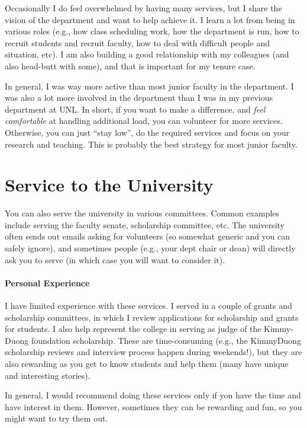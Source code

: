 \documentclass[oneside,11pt,dvipsnames]{book}
\begin{document}
Occasionally I do feel overwhelmed by having many services, but I share the vision of the department and want to help achieve it.
I learn a lot from being in various roles (e.g., how class scheduling work, how the department is run, how to recruit students and recruit faculty, how to deal with difficult people and situation, etc).
I am also building a good relationship with my colleagues (and also head-butt with some), and that is important for my tenure case. 

In general, I was way more active than most junior faculty in the department.  I was also a lot more involved in the department than I was in my previous department at UNL.
In short, if you want to make a difference, and \emph{feel comfortable} at handling additional load, you can volunteer for more services. Otherwise, you can just ``stay low'',
do the required services and focus on your research and teaching. This is probably the best strategy for most junior faculty. 

\section{Service to the University}
You can also serve the university in various committees.
Common examples include serving the faculty senate, scholarship committee, etc. The university often sends out emails asking for volunteers (so somewhat generic and you can safely ignore), and sometimes people (e.g., your dept chair or dean) will directly ask you to serve (in which case you will want to consider it).

\paragraph{Personal Experience} I have limited experience with these services. I served in a couple of grants and scholarship committees, in which I review applications for scholarship and grants for students. I also help represent the college in serving as judge of the Kimmy-Duong foundation scholarship. These are time-consuming (e.g., the KimmyDuong scholarship reviews and interview process happen during weekends!), but they are also rewarding as you get to know students and help them (many have unique and interesting stories). 

In general, I would recommend doing these services only if you have the time and have interest in them. However, sometimes they can be rewarding and fun, so you might want to try them out.
\end{document}
